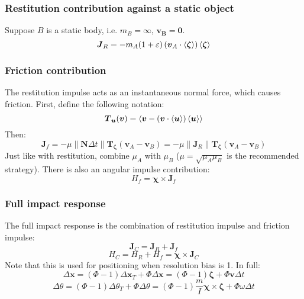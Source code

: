 \documentclass[10pt]{report}
\begin{document}
\subsubsection{Restitution contribution against a static object}
Suppose $B$ is a static body, i.e. $m_B=\infty$, $\boldsymbol{v_B}=\boldsymbol{0}$.
\begin{equation}\boldsymbol{J}_R=-m_A(1+\varepsilon)\left(\boldsymbol{v}_A\cdot\braket{\boldsymbol{\zeta}}\right)\braket{\boldsymbol{\zeta}}\end{equation}

\subsubsection{Friction contribution}
The restitution impulse acts as an instantaneous normal force, which causes friction. First, define the following notation:
\begin{equation}\boldsymbol{T}_{\boldsymbol{u}}(\boldsymbol{v})=\braket{\boldsymbol{v}-(\boldsymbol{v}\cdot\braket{\boldsymbol{u}})\braket{\boldsymbol{u}}}\end{equation}
Then:
\begin{equation}\boldsymbol{J}_f=-\mu\|\boldsymbol{N}\Delta t\|\boldsymbol{T}_{\boldsymbol{\zeta}}(\boldsymbol{v}_A-\boldsymbol{v}_B)=-\mu\left\|\boldsymbol{J}_R\right\|\boldsymbol{T}_{\boldsymbol{\zeta}}(\boldsymbol{v}_A-\boldsymbol{v}_B)\end{equation}
Just like with restitution, combine $\mu_A$ with $\mu_B$ ($\mu=\sqrt{\mu_A\mu_B}$ is the recommended strategy). There is also an angular impulse contribution:
\begin{equation}H_f=\boldsymbol{\chi}\times\boldsymbol{J}_f\end{equation}

\subsubsection{Full impact response}
The full impact response is the combination of restitution impulse and friction impulse:
\begin{equation}\boldsymbol{J}_C=\boldsymbol{J}_R+\boldsymbol{J}_f\end{equation}
\begin{equation}H_C=H_R+H_f=\boldsymbol{\chi}\times\boldsymbol{J}_C\end{equation}
Note that this is used for positioning when resolution bias is 1. In full:
\begin{equation}\Delta\boldsymbol{x}=(\Phi-1)\Delta\boldsymbol{x}_T+\Phi\Delta\boldsymbol{x}=(\Phi-1)\boldsymbol{\zeta}+\Phi\boldsymbol{v}\Delta t\end{equation}
\begin{equation}\Delta\theta=(\Phi-1)\Delta\theta_T+\Phi\Delta\theta=(\Phi-1)\frac{m}{I}\boldsymbol{\chi}\times\boldsymbol{\zeta}+\Phi\omega\Delta t\end{equation}
\end{document}
